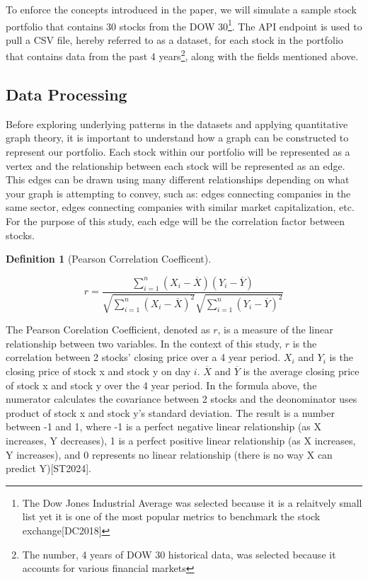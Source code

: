 \documentclass{article}
\newtheorem{definition}[theorem]{Definition}
\begin{document}
To enforce the concepts introduced in the paper, we will simulate a sample stock portfolio that contains 30 stocks from the DOW 30\footnote{The Dow Jones Industrial Average was selected because it is a relaitvely small list yet it is one of the most popular metrics to benchmark the stock exchange[DC2018]}. The API endpoint is used to pull a CSV file, hereby referred to as a dataset, for each stock in the portfolio that contains data from the past 4 years\footnote{The number, 4 years of DOW 30 historical data, was selected because it accounts for various financial markets}, along with the fields mentioned above.

\subsection{Data Processing}

Before exploring underlying patterns in the datasets and applying quantitative graph theory, it is important to understand how a graph can be constructed to represent our portfolio. Each stock within our portfolio will be represented as a vertex and the relationship between each stock will be represented as an edge. This edges can be drawn using many different relationships depending on what your graph is attempting to convey, such as: edges connecting companies in the same sector, edges connecting companies with similar market capitalization, etc. For the purpose of this study, each edge will be the correlation factor between stocks.

\begin{definition}[Pearson Correlation Coefficent]
\end{definition}

\[
r = \frac{\sum_{i=1}^n (X_i - \overline{X})(Y_i - \overline{Y})}{\sqrt{\sum_{i=1}^n (X_i - \overline{X})^2} \sqrt{\sum_{i=1}^n (Y_i - \overline{Y})^2}}
\]

The Pearson Corelation Coefficient, denoted as $r$, is a measure of the linear relationship between two variables. In the context of this study, $r$ is the correlation between 2 stocks' closing price over a 4 year period. $X_i$ and $Y_i$ is the closing price of stock x and stock y on day $i$. $\overline{X}$ and $\overline{Y}$ is the average closing price of stock x and stock y over the 4 year period. In the formula above, the numerator calculates the covariance between 2 stocks and the deonominator uses product of stock x and stock y's standard deviation. The result is a number between -1 and 1, where -1 is a perfect negative linear relationship (as X increases, Y decreases), 1 is a perfect positive linear relationship (as X increases, Y increases), and 0 represents no linear relationship (there is no way X can predict Y)[ST2024]. 
\end{document}
